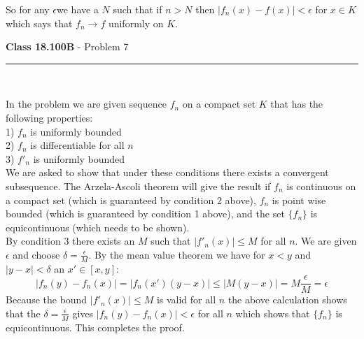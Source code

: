 \documentclass[11pt,reqno]{article}
\begin{document}
So for any $\epsilon $we have a $N$ such that if $n > N$ then $|f_n(x) - f(x)| < \epsilon$ for $x \in K$which says that $f_n \to f$ uniformly on $K$.

\vspace{15pt}
\begin{flushleft} 
\textbf{Class 18.100B} - Problem 7\\
\rule{500pt}{1pt}\\
\end{flushleft} 

In the problem we are given sequence $f_n$ on a compact set $K$ that has the following properties:\\
1) $f_n$ is uniformly bounded\\
2) $f_n$ is differentiable for all $n$\\
3) $f'_n$ is uniformly bounded \\
We are asked to show that under these conditions there exists a convergent subsequence.
The Arzela-Ascoli theorem will give the result if $f_n$ is continuous on a compact set (which is guaranteed by condition 2 above), $f_n$ is point wise bounded (which is guaranteed by condition 1 above), and the set $\{f_n\}$ is equicontinuous (which needs to be shown).\\
By condition 3 there exists an $M$ such that $|f'_n(x)| \le M$ for all $n$. We are given $\epsilon$ and choose $\delta = \frac{\epsilon}{M}$. By the mean value theorem we have for $x < y$ and $|y-x| < \delta$ an $x' \in [x,y]$:
\[ |f_n(y) - f_n(x)| = |f_n(x')(y - x)| \le |M(y-x)| = M \frac{\epsilon}{M} = \epsilon\]
Because the bound $|f'_n(x)| \le M$ is valid for all $n$ the above calculation shows that the $\delta = \frac{\epsilon}{M}$ gives $|f_n(y)- f_n(x)| < \epsilon$ for all $n$ which shows that $\{ f_n \}$ is equicontinuous. This completes the proof.
\end{document}
